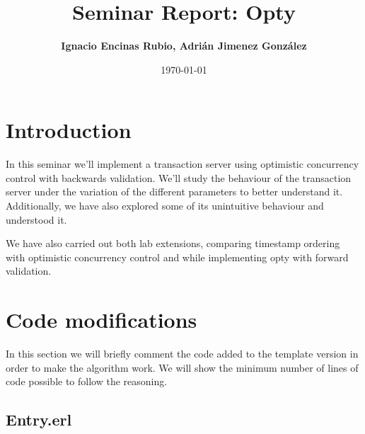 \documentclass[a4paper, 10pt]{article}
\title{Seminar Report: Opty}
\author{\textbf{Ignacio Encinas Rubio, Adrián Jimenez González}}
\date{\normalsize\today{}}
\begin{document}
\maketitle

  
  

\section{Introduction}


In this seminar we'll implement a transaction server using optimistic concurrency control with backwards validation. We'll study the behaviour of the transaction server under the variation of the different parameters to better understand it. Additionally, we have also explored some of its unintuitive behaviour and understood it. 

We have also carried out both lab extensions, comparing timestamp ordering with optimistic concurrency control and while implementing opty with forward validation.

\section{Code modifications}

   In this section we will briefly comment the code added to the template version in order to
   make the algorithm work. We will show the minimum number of lines of code possible to follow the reasoning.

  \subsection{Entry.erl}
\end{document}
